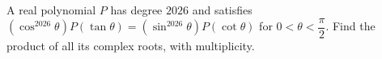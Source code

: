A real polynomial $P$ has degree $2026$ and satisfies $(\cos^{2026}\theta)P(\tan\theta)=(\sin^{2026}\theta)P(\cot\theta)$ for $0<\theta<\dfrac{\pi}{2}$. Find the product of all its complex roots, with multiplicity.

